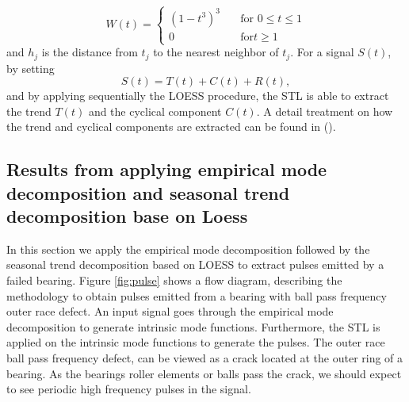 \documentclass[../Main/thesis.tex]{subfiles}
\begin{document}
\begin{equation}
W(t) = 
  \begin{cases}
  \left(1-t^{3}\right)^{3} &\quad\text{for } 0\leq t \le 1\\
   0 &\quad\text{for} t\geq 1
 \end{cases}
\end{equation}
and $h_{j}$ is the distance from $t_{j}$ to the nearest neighbor of $t_{j}$. For a signal $S(t)$, by setting 
\begin{equation}
S(t) = T(t) + C(t) + R(t), \nonumber
\end{equation}  
and by applying sequentially the LOESS procedure, the STL is able to extract the trend $T(t)$ and the cyclical component $C(t)$. A detail treatment on how the trend and cyclical components are extracted can be found in  (\cite{Cleveland-et-al-1990}).





\subsection{Results from applying empirical mode decomposition and seasonal trend decomposition base on Loess}
In this section we apply the empirical mode decomposition followed by the seasonal trend decomposition based on LOESS to extract pulses emitted by a failed bearing.
Figure \ref{fig:pulse} shows a flow diagram, describing the methodology to obtain pulses emitted from a bearing with ball pass frequency outer race defect. An input signal goes through the empirical mode decomposition to generate intrinsic mode functions. Furthermore, the STL is applied on the intrinsic mode functions to generate the pulses. 
The outer race ball pass frequency defect, can be viewed as a crack located at the outer ring of a bearing. As the bearings roller elements or balls pass the crack, we should expect to see periodic high frequency pulses in the signal. 
\end{document}
